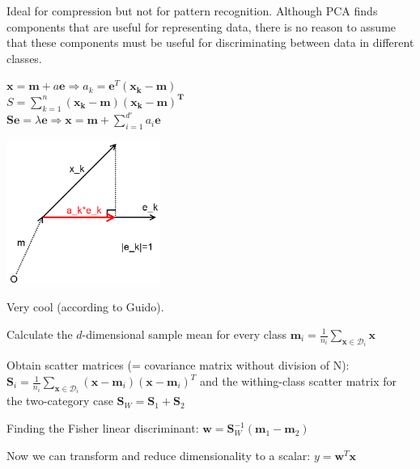   \begin{minipage}{13cm}
  
  Ideal for compression but not for pattern recognition.
  Although PCA finds components that are useful for representing data, there is no reason to 
  assume that these components must be useful for discriminating between data in different classes.\\
  \begin{center}
  $\bm{x}=\bm{m}+a \bm{e} \Rightarrow a_k=\bm{e}^T(\bm{x_k-m})$\\
  $S=\sum\limits_{k=1}^{n}{\bm{(x_k-m)(x_k-m)^T}}$\\
  $\bm{S e}=\lambda \bm{e} \Rightarrow \bm{x}=\bm{m}+\sum\limits_{i=1}^{d'}{a_i \bm{e}}$
  \end{center}
  \end{minipage}
  \begin{minipage}{5cm}
  	\includegraphics[width=5cm]{./images/principalComp.png}
  \end{minipage} 
  \begin{minipage}{10.5cm}
  Very cool (according to Guido).
    \begin{aufzaehlung}
      \item Calculate the $d$-dimensional sample mean for every class
        $\bm{m}_i = \frac{1}{n_i} \sum\limits_{\bm{x} \in \mathcal{D}_i} \bm{x}$
      \item Obtain scatter matrices (= covariance matrix without division of N):
        $\bm{S}_i = \frac{1}{n_i} \sum\limits_{\bm{x} \in \mathcal{D}_i} 
        (\bm{x}-\bm{m}_i) (\bm{x}-\bm{m}_i)^T$
        and the withing-class scatter matrix for the two-category case
        $\bm{S}_W = \bm{S}_1 + \bm{S}_2$
      \item Finding the Fisher linear discriminant:
        $\bm{w} = \bm{S}_W^{-1} (\bm{m}_1 - \bm{m}_2)$
      \item Now we can transform and reduce dimensionality to a scalar:
        $y = \bm{w}^T \bm{x}$
    \end{aufzaehlung}
  \end{minipage}\hspace{5mm}
